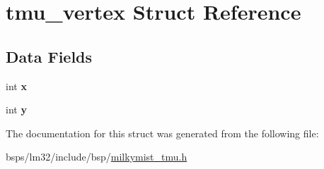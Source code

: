 \hypertarget{structtmu__vertex}{}\section{tmu\+\_\+vertex Struct Reference}
\label{structtmu__vertex}
\subsection*{Data Fields}
\begin{DoxyCompactItemize}
\item 
\mbox{\label{structtmu__vertex_a87d88d9abe98d893d86a73f3d9dd7c4f}} 
int {\bfseries x}
\item 
\mbox{\label{structtmu__vertex_ac79a81047d7b409f1043a80885847079}} 
int {\bfseries y}
\end{DoxyCompactItemize}


The documentation for this struct was generated from the following file\+:\begin{DoxyCompactItemize}
\item 
bsps/lm32/include/bsp/\mbox{\hyperlink{milkymist__tmu_8h}{milkymist\+\_\+tmu.\+h}}\end{DoxyCompactItemize}
